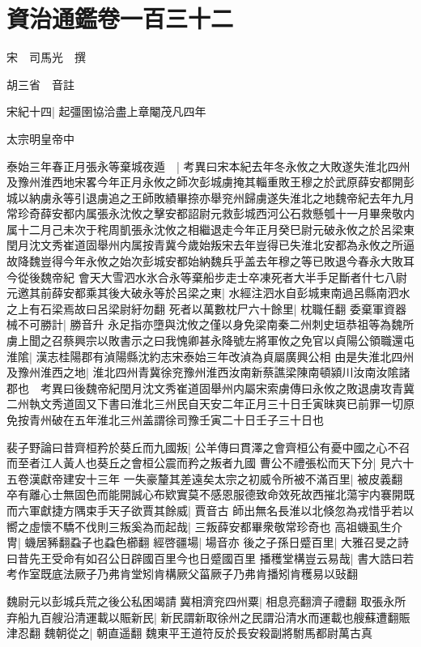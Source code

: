 \section{資治通鑑卷一百三十二}
宋　司馬光　撰

胡三省　音註

宋紀十四|{
	起彊圉協洽盡上章閹茂凡四年}


太宗明皇帝中

泰始三年春正月張永等棄城夜遁　|{
	考異曰宋本紀去年冬永攸之大敗遂失淮北四州及豫州淮西地宋畧今年正月永攸之師次彭城虜掩其輜重敗王穆之於武原薛安都開彭城以納虜永等引退虜追之王師敗績畢捺亦舉兖州歸虜遂失淮北之地魏帝紀去年九月常珍奇薛安都内属張永沈攸之擊安都詔尉元救彭城西河公石救懸瓠十一月畢衆敬内属十二月己未次于秺周凱張永沈攸之相繼退走今年正月癸巳尉元破永攸之於呂梁東閏月沈文秀崔道固舉州内属按青冀今歲始叛宋去年豈得已失淮北安都為永攸之所逼故降魏豈得今年永攸之始次彭城安都始納魏兵乎盖去年穆之等已敗退今春永大敗耳今從後魏帝紀}
會天大雪泗水氷合永等棄船步走士卒凍死者大半手足斷者什七八尉元邀其前薛安都乘其後大破永等於呂梁之東|{
	水經注泗水自彭城東南過呂縣南泗水之上有石梁焉故曰呂梁尉紆勿翻}
死者以萬數枕尸六十餘里|{
	枕職任翻}
委棄軍資器械不可勝計|{
	勝音升}
永足指亦墮與沈攸之僅以身免梁南秦二州刺史垣恭祖等為魏所虜上聞之召蔡興宗以敗書示之曰我愧卿甚永降號左將軍攸之免官以貞陽公領職還屯淮隂|{
	漢志桂陽郡有湞陽縣沈約志宋泰始三年改湞為貞屬廣興公相}
由是失淮北四州及豫州淮西之地|{
	淮北四州青冀徐兖豫州淮西汝南新蔡譙梁陳南頓潁川汝南汝隂諸郡也　考異曰後魏帝紀閏月沈文秀崔道固舉州内屬宋索虜傳曰永攸之敗退虜攻青冀二州執文秀道固又下書曰淮北三州民自天安二年正月三十日壬寅昧爽已前罪一切原免按青州破在五年淮北三州盖謂徐司豫壬寅二十日壬子三十日也}


裴子野論曰昔齊桓矜於葵丘而九國叛|{
	公羊傳曰貫澤之會齊桓公有憂中國之心不召而至者江人黃人也葵丘之會桓公震而矜之叛者九國}
曹公不禮張松而天下分|{
	見六十五卷漢獻帝建安十三年}
一失豪釐其差遠矣太宗之初威令所被不滿百里|{
	被皮義翻}
卒有離心士無固色而能開誠心布欵實莫不感恩服德致命效死故西摧北蕩宇内褰開既而六軍獻捷方隅束手天子欲賈其餘威|{
	賈音古}
師出無名長淮以北倏忽為戎惜乎若以嚮之虛懷不驕不伐則三叛奚為而起哉|{
	三叛薛安都畢衆敬常珍奇也}
高祖蟣虱生介冑|{
	蟣居豨翻蝨子也蝨色櫛翻}
經啓疆場|{
	場音亦}
後之子孫日蹙百里|{
	大雅召旻之詩曰昔先王受命有如召公日辟國百里今也日蹙國百里}
播穫堂構豈云易哉|{
	書大誥曰若考作室既底法厥子乃弗肯堂矧肯構厥父菑厥子乃弗肯播矧肯穫易以䜴翻}


魏尉元以彭城兵荒之後公私困竭請冀相濟兖四州粟|{
	相息亮翻濟子禮翻}
取張永所弃船九百艘沿清運載以賑新民|{
	新民謂新取徐州之民謂沿清水而運載也艘蘇遭翻賑津忍翻}
魏朝從之|{
	朝直遥翻}
魏東平王道符反於長安殺副將駙馬都尉萬古真

